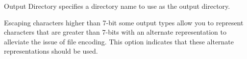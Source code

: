 \begin{configuration}{Output Directory}
specifies a directory name to use as the output directory.
\end{configuration}

\begin{configuration}{Escaping characters higher than 7-bit}
some output types allow you to represent characters that are greater than
7-bits with an alternate representation to alleviate the issue of
file encoding.  This option indicates that these alternate representations
should be used.

\end{configuration}

